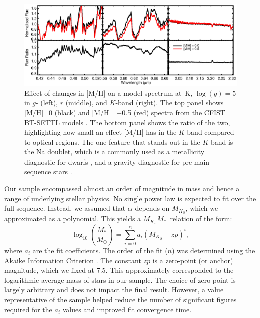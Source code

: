 \documentclass[twocolumn]{aastex62}
\newcommand{\mks}{$M_{K_S}$}
\newcommand{\mmk}{$M_{K_S}$\textendash$M_*$}
\begin{document}
\begin{figure}[htb]
\begin{center}
\includegraphics[width=\textwidth]{metallicity_effect.eps}
\caption{Effect of changes in [M/H] on a model spectrum at \,K, $\log(g)=5$ in $g$- (left), $r$ (middle), and $K$-band (right). The top panel shows [M/H]=0 (black) and [M/H]=+0.5 (red) spectra from the CFIST BT-SETTL models \citep{2012RSPTA.370.2765A}. The bottom panel shows the ratio of the two, highlighting how small an effect [M/H] has in the $K$-band compared to optical regions. The one feature that stands out in the $K$-band is the Na doublet, which is a commonly used as a metallicity diagnostic for dwarfs \citep{RojasAyala:2010,Terrien:2012lr,Newton:2014}, and a gravity diagnostic for pre-main-sequence stars \citep[e.g.,][]{Schlieder2012}. }
\label{fig:metal}
\end{center}
\end{figure}

Our sample encompassed almost an order of magnitude in mass and hence a range of underlying stellar physics. No single power law is expected to fit over the full sequence. Instead, we assumed that $\alpha$ depends on \mks, which we approximated as a polynomial. This yields a \mmk\ relation of the form:
\begin{equation}\label{eqn:mmk}
\log_{10} \left( \frac{M_*}{M_\odot} \right) = \sum_{i=0}^{n} a_i(M_{K_S}-zp)^i,
\end{equation}
where $a_i$ are the fit coefficients. The order of the fit ($n$) was determined using the Akaike Information Criterion \citep[AIC, ][]{Akaike1974}. The constant $zp$ is a zero-point (or anchor) magnitude, which we fixed at 7.5. This approximately corresponded to the logarithmic average mass of stars in our sample. The choice of zero-point is largely arbitrary and does not impact the final result. However, a value representative of the sample helped reduce the number of significant figures required for the $a_i$ values and improved fit convergence time. 
\end{document}
